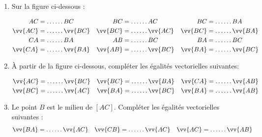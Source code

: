 \documentclass[main.tex]{subfiles}
\begin{document}
\begin{exercise}\hfill 
\begin{enumerate}[label=\alph*),leftmargin=*]
\item Sur la figure ci-dessous : 
\begin{minipage}{0.8\columnwidth}%
\centering
{}
\end{minipage} 
%	
\begin{align*}
{AC}&= \ldots \ldots  {BC}
& {BC}&=\ldots \ldots  {AC}
&  {BC}&=\ldots \ldots  {BA} \\
\vv{AC}&= \ldots \ldots \vv{BC}
&\vv{BC}&=\ldots \ldots \vv{AC}
& \vv{BC}&=\ldots \ldots \vv{BA} \\
{CA}&=\ldots \ldots {BA}
& {AB}&=\ldots \ldots {BC} 
& {BA}&=\ldots \ldots {BC} \\
\vv{CA}&=\ldots \ldots \vv{BA}
& \vv{AB}&=\ldots \ldots \vv{BC} 
& \vv{BA}&=\ldots \ldots \vv{BC}  
\end{align*}  
\item À partir de la figure ci-dessous, compléter les égalités vectorielles suivantes:
\\
\begin{minipage}{1\columnwidth}%
\centering
{}
\end{minipage} 
\begin{align*}
\vv{AC}& = \ldots \ldots \vv{BC}
&\vv{BC}& = \ldots \ldots \vv{BA}
& \vv{CA}& = \ldots \ldots \vv{AB}\\
\vv{BC}& = \ldots \ldots \vv{AC}
& \vv{BA}& = \ldots \ldots \vv{BC}
& \vv{BA}& = \ldots \ldots \vv{AB}
\end{align*} 
\item Le point $B$ est le milieu de $[AC]$. Compléter les égalités vectorielles suivantes :
\begin{align*}
\vv{BA}& = \ldots \ldots \vv{AC}
&\vv{CB}& = \ldots \ldots \vv{AC}
& \vv{AC}& = \ldots \ldots \vv{AB} 
\end{align*}  
\end{enumerate}
\end{exercise}
\end{document}
